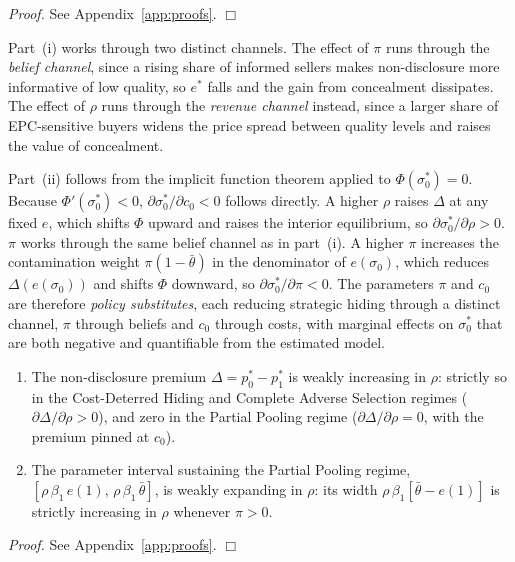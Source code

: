 \noindent\textit{Proof.} See Appendix~\ref{app:proofs}. $\Box$

\noindent Part~(i) works through two distinct channels. The effect of $\pi$ runs through the \textit{belief channel}, since a rising share of informed sellers makes non-disclosure more informative of low quality, so $e^*$ falls and the gain from concealment dissipates. The effect of $\rho$ runs through the \textit{revenue channel} instead, since a larger share of EPC-sensitive buyers widens the price spread between quality levels and raises the value of concealment.

Part~(ii) follows from the implicit function theorem applied to $\Phi(\sigma_0^*)=0$. Because $\Phi'(\sigma_0^*)<0$, $\partial\sigma_0^*/\partial c_0 < 0$ follows directly. A higher $\rho$ raises $\Delta$ at any fixed $e$, which shifts $\Phi$ upward and raises the interior equilibrium, so $\partial\sigma_0^*/\partial\rho > 0$. $\pi$ works through the same belief channel as in part~(i). A higher $\pi$ increases the contamination weight $\pi(1-\bar{\theta})$ in the denominator of $e(\sigma_0)$, which reduces $\Delta(e(\sigma_0))$ and shifts $\Phi$ downward, so $\partial\sigma_0^*/\partial\pi < 0$. The parameters $\pi$ and $c_0$ are therefore \textit{policy substitutes}, each reducing strategic hiding through a distinct channel, $\pi$ through beliefs and $c_0$ through costs, with marginal effects on $\sigma_0^*$ that are both negative and quantifiable from the estimated model.

\begin{corollary}
\label{cor:rho}
\begin{enumerate}[label=(\roman*)]
    \item The non-disclosure premium $\Delta = p_0^* - p_1^*$ is weakly increasing in $\rho$: strictly so in the Cost-Deterred Hiding and Complete Adverse Selection regimes ($\partial\Delta/\partial\rho > 0$), and zero in the Partial Pooling regime ($\partial\Delta/\partial\rho = 0$, with the premium pinned at $c_0$).
    \item The parameter interval sustaining the Partial Pooling regime, $[\rho\,\beta_1\,e(1),\,\rho\,\beta_1\,\bar{\theta}]$, is weakly expanding in $\rho$: its width $\rho\,\beta_1[\bar{\theta}-e(1)]$ is strictly increasing in $\rho$ whenever $\pi>0$.
\end{enumerate}
\end{corollary}

\noindent\textit{Proof.} See Appendix~\ref{app:proofs}. $\Box$

